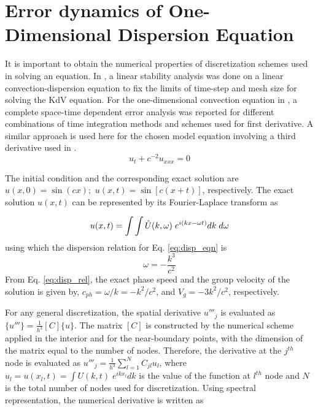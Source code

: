 \section{Error dynamics of One-Dimensional Dispersion Equation} 
\label{sec:err}
It is important to obtain the numerical properties of discretization schemes used in solving an equation. In \cite{Fornberg1978}, a linear stability analysis was done on a linear convection-dispersion equation to fix the limits of time-step and mesh size for solving the KdV equation. For the one-dimensional convection equation in \cite{Sengupta2007}, a complete space-time dependent error analysis was reported for different combinations of time integration methods and schemes used for first derivative. A similar approach is used here for the chosen model equation involving a third derivative 
used in \cite{Li2006,Yan2002}.
\begin{equation}
\label{eq:disp_eqn}
u_t + c^{-2}u_{xxx} = 0
\end{equation}

The initial condition and the corresponding exact solution are $u(x,0)=\sin(cx);$ $u(x,t)=\sin[c(x+t)]$, respectively. The exact solution $u(x,t)$ can be represented  by its Fourier-Laplace transform as 

\begin{equation*} 
u(x,t) = \int \int \hat{U}(k, \omega)  \hspace{1mm} e^{i(kx-\omega t)} dk 
\hspace{1mm} d{\omega}
\end{equation*}
using which the dispersion relation for Eq. \eqref{eq:disp_eqn} is 
\begin{equation}
\label{eq:disp_rel}
\omega = -\frac{k^3}{c^2}
\end{equation}
From Eq. \eqref{eq:disp_rel}, the exact phase speed and the group velocity of the solution is given by, $c_{ph} = \omega/k= -k^2/c^2$, and 
$V_g = -3k^2/c^2$, respectively.

For any general discretization, the spatial derivative $u'''_j$ is evaluated as $\{u'''\} = \frac {1}{h^3} [C] \{u\}$. The matrix $[C]$ is constructed 
by the numerical scheme applied in the interior and for the near-boundary points, with the dimension of the matrix equal to the number of nodes. 
Therefore, the derivative at the $j^{th}$ node is evaluated as $u'''_j = \frac {1}{h^3} \sum_{l=1}^{N} C_{jl} u_l$, where $ u_l = u(x_l,t) = \int U(k,t)\; e^{i k x_l} dk$ is the value of the function at $l^{th}$ node and $N$ is the total number of nodes used for discretization. Using spectral representation, the numerical derivative is written as

